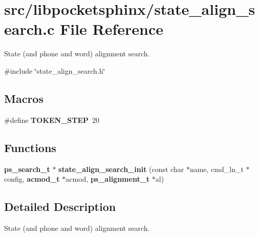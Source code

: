 \section{src/libpocketsphinx/state\+\_\+align\+\_\+search.c File Reference}
\label{state__align__search_8c}


State (and phone and word) alignment search.  


{\ttfamily \#include \char`\"{}state\+\_\+align\+\_\+search.\+h\char`\"{}}\newline
\subsection*{Macros}
\begin{DoxyCompactItemize}
\item 
\mbox{\label{state__align__search_8c_a197a0cf5b150b88b0e3043fd78550931}} 
\#define {\bfseries T\+O\+K\+E\+N\+\_\+\+S\+T\+EP}~20
\end{DoxyCompactItemize}
\subsection*{Functions}
\begin{DoxyCompactItemize}
\item 
\mbox{\label{state__align__search_8c_a037465636cb9d40dd1ebc1e04c0fd633}} 
\textbf{ ps\+\_\+search\+\_\+t} $\ast$ {\bfseries state\+\_\+align\+\_\+search\+\_\+init} (const char $\ast$name, cmd\+\_\+ln\+\_\+t $\ast$config, \textbf{ acmod\+\_\+t} $\ast$acmod, \textbf{ ps\+\_\+alignment\+\_\+t} $\ast$al)
\end{DoxyCompactItemize}


\subsection{Detailed Description}
State (and phone and word) alignment search. 

